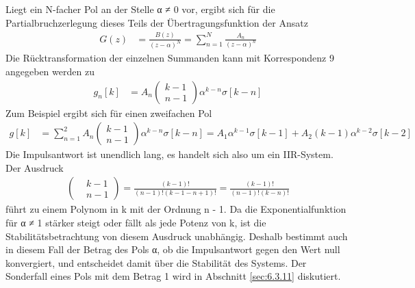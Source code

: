 Liegt ein N-facher Pol an der Stelle α ≠ 0 vor, ergibt sich für die Partialbruchzerlegung dieses Teils der Übertragungsfunktion der Ansatz
\begin{align}
G(z) &= \frac{B(z)}{(z - \alpha)^{N}} = \sum\limits_{n = 1}^{N}\frac{A_{n}}{(z - \alpha)^{n}} \label{eq:6.96}
\end{align}
Die Rücktransformation der einzelnen Summanden kann mit Korrespondenz 9 angegeben werden zu
\begin{align}
g_{n}[ k] &= A_{n}  \left( \begin{array}{r}
k - 1 \\
n - 1
\end{array} \right)  \alpha^{k - n}  \sigma[ k - n] \label{eq:6.97}
\end{align}
Zum Beispiel ergibt sich für einen zweifachen Pol
\begin{align}
g[ k] &= \sum\limits_{n = 1}^{2}{A_{n}  \left( \begin{array}{r}
k - 1 \\
n - 1
\end{array} \right)  \alpha^{k - n}  \sigma[ k - n] = A_{1}  \alpha^{k - 1}  \sigma[ k - 1] + A_{2}  (k - 1)  \alpha^{k - 2}  \sigma[ k - 2]} \label{eq:6.98}
\end{align}
Die Impulsantwort ist unendlich lang, es handelt sich also um ein IIR-System. Der Ausdruck
\begin{align}
\left( \begin{aligned}
 & k - 1 \\
 & n - 1
\end{aligned} \right) = \frac{(k - 1)!}{(n - 1)!  (k - 1 - n + 1)!} = \frac{(k - 1)!}{(n - 1)!  (k - n)!} \label{eq:6.99}
\end{align}
führt zu einem Polynom in k mit der Ordnung n - 1. Da die Exponentialfunktion für α ≠ 1 stärker steigt oder fällt als jede Potenz von k, ist die Stabilitätsbetrachtung von diesem Ausdruck unabhängig. Deshalb bestimmt auch in diesem Fall der Betrag des Pols α, ob die Impulsantwort gegen den Wert null konvergiert, und entscheidet damit über die Stabilität des Systems. Der Sonderfall eines Pols mit dem Betrag 1 wird in Abschnitt \ref{sec:6.3.11} diskutiert.


